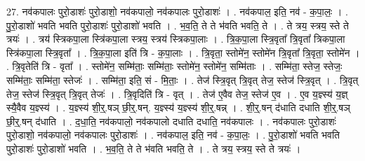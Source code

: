 \documentclass[17pt]{extarticle}
\begin{document}
27. नव॑कपालः पुरो॒डाशः॑ पुरो॒डाशो॒ नव॑कपालो॒ नव॑कपालः पुरो॒डाशः॑ । . नव॑कपाल॒ इति॒ नव॑ - क॒पा॒लः॒ । . पु॒रो॒डाशो॑ भवति भवति पुरो॒डाशः॑ पुरो॒डाशो॑ भवति । . भ॒व॒ति॒ ते ते भ॑वति भवति॒ ते । . ते त्रय॒ स्त्रय॒ स्ते ते त्रयः॑ । . त्रय॑ स्त्रिकपा॒ला स्त्रि॑कपा॒ला स्त्रय॒ स्त्रय॑ स्त्रिकपा॒लाः । . त्रि॒क॒पा॒ला स्त्रि॒वृता᳚ त्रि॒वृता᳚ त्रिकपा॒ला स्त्रि॑कपा॒ला स्त्रि॒वृता᳚ । . त्रि॒क॒पा॒ला इति॑ त्रि - क॒पा॒लाः । . त्रि॒वृता॒ स्तोमे॑न॒ स्तोमे॑न त्रि॒वृता᳚ त्रि॒वृता॒ स्तोमे॑न । . त्रि॒वृतेति॑ त्रि - वृता᳚ । . स्तोमे॑न॒ सम्मि॑ताः॒ सम्मि॑ताः॒ स्तोमे॑न॒ स्तोमे॑न॒ सम्मि॑ताः । . सम्मि॑ता॒ स्तेज॒ स्तेजः॒ सम्मि॑ताः॒ सम्मि॑ता॒ स्तेजः॑ । . सम्मि॑ता॒ इति॒ सं - मि॒ताः॒ । . तेज॑ स्त्रि॒वृत् त्रि॒वृत् तेज॒ स्तेज॑ स्त्रि॒वृत् । . त्रि॒वृत् तेज॒ स्तेज॑ स्त्रि॒वृत् त्रि॒वृत् तेजः॑ । . त्रि॒वृदिति॑ त्रि - वृत् । . तेज॑ ए॒वैव तेज॒ स्तेज॑ ए॒व । . ए॒व य॒ज्ञ्स्य॑ य॒ज्ञ् स्यै॒वैव य॒ज्ञ्स्य॑ । . य॒ज्ञ्स्य॑ शी॒र्॒.षञ् छी॒र्॒.षन्. य॒ज्ञ्स्य॑ य॒ज्ञ्स्य॑ शी॒र्॒.षन्न् । . शी॒र्॒.षन् द॑धाति दधाति शी॒र्॒.षञ् छी॒र्॒.षन् द॑धाति । . द॒धा॒ति॒ नव॑कपालो॒ नव॑कपालो दधाति दधाति॒ नव॑कपालः । . नव॑कपालः पुरो॒डाशः॑ पुरो॒डाशो॒ नव॑कपालो॒ नव॑कपालः पुरो॒डाशः॑ । . नव॑कपाल॒ इति॒ नव॑ - क॒पा॒लः॒ । . पु॒रो॒डाशो॑ भवति भवति पुरो॒डाशः॑ पुरो॒डाशो॑ भवति । . भ॒व॒ति॒ ते ते भ॑वति भवति॒ ते । . ते त्रय॒ स्त्रय॒ स्ते ते त्रयः॑ । \newline
\end{document}
